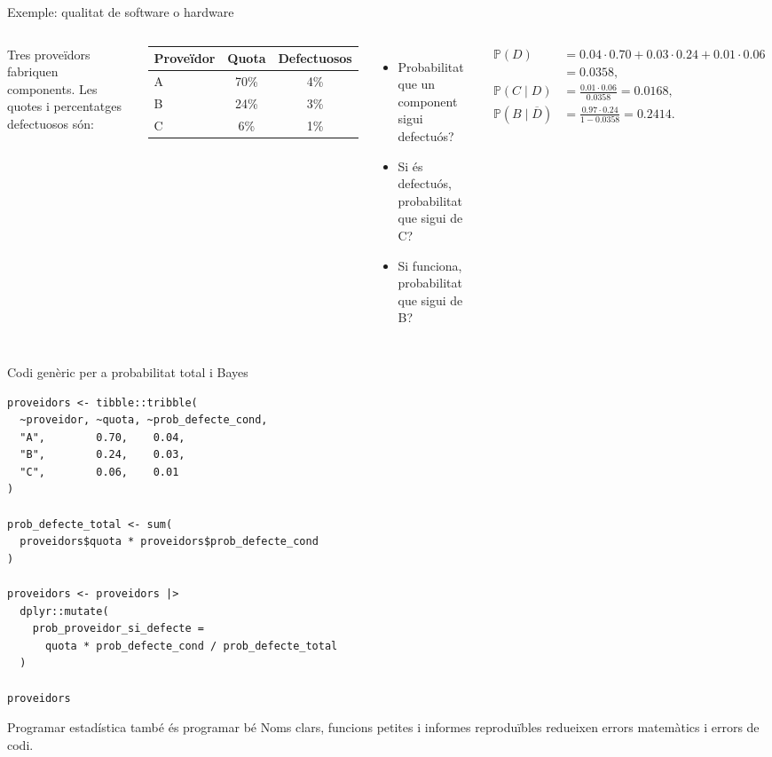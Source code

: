 \documentclass[10pt,aspectratio=169]{beamer}
\newcommand{\Prob}{\mathbb{P}}
\begin{document}
\begin{frame}{Exemple: qualitat de software o hardware}
\begin{columns}[T]
Tres proveïdors fabriquen components. Les quotes i percentatges defectuosos són:
\begin{center}
\small
\begin{tabular}{lcc}
\toprule
Proveïdor & Quota & Defectuosos \\
\midrule
A & 70\% & 4\% \\
B & 24\% & 3\% \\
C & 6\% & 1\% \\
\bottomrule
\end{tabular}
\end{center}
\begin{itemize}
  \item Probabilitat que un component sigui defectuós?
  \item Si és defectuós, probabilitat que sigui de C?
  \item Si funciona, probabilitat que sigui de B?
\end{itemize}
\begin{align*}
\Prob(D) &= 0.04\cdot 0.70 + 0.03\cdot 0.24 + 0.01\cdot 0.06 \\
&=0.0358,\\[0.2cm]
\Prob(C\mid D) &= \frac{0.01\cdot 0.06}{0.0358}=0.0168,\\[0.2cm]
\Prob(B\mid \overline{D}) &= \frac{0.97\cdot 0.24}{1-0.0358}=0.2414.
\end{align*}
\end{columns}
\end{frame}

\begin{frame}[fragile]{Codi genèric per a probabilitat total i Bayes}
\begin{lstlisting}
proveidors <- tibble::tribble(
  ~proveidor, ~quota, ~prob_defecte_cond,
  "A",        0.70,    0.04,
  "B",        0.24,    0.03,
  "C",        0.06,    0.01
)

prob_defecte_total <- sum(
  proveidors$quota * proveidors$prob_defecte_cond
)

proveidors <- proveidors |>
  dplyr::mutate(
    prob_proveidor_si_defecte =
      quota * prob_defecte_cond / prob_defecte_total
  )

proveidors
\end{lstlisting}
\vspace{0.1cm}
\begin{block}{Programar estadística també és programar bé}
Noms clars, funcions petites i informes reproduïbles redueixen errors matemàtics i errors de codi.
\end{block}
\end{frame}
\end{document}

